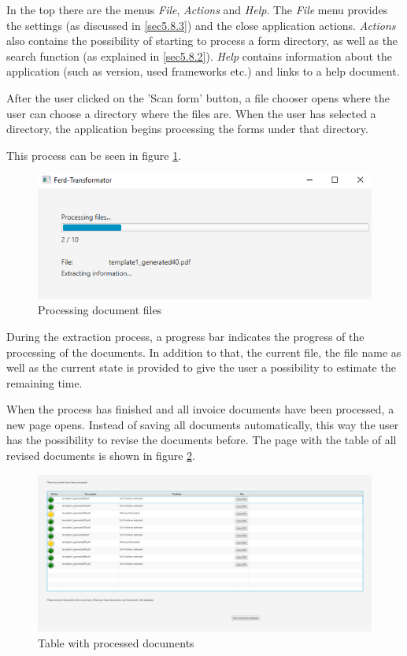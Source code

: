 In the top there are the menus \emph{File}, \emph{Actions} and \emph{Help}. The \emph{File} menu provides the settings (as discussed in \ref{sec5.8.3}) and the close application actions.
\emph{Actions} also contains the possibility of starting to process a form directory, as well as the search function (as explained in \ref{sec5.8.2}).
\emph{Help} contains information about the application (such as version, used frameworks etc.) and links to a help document.

After the user clicked on the 'Scan form' button, a file chooser opens where the user can choose a directory where the files are. When the user has selected a directory, the application begins processing the forms under that directory.

This process can be seen in figure \ref{processingFiles}.

\begin{figure}[ht!]
\centering
\includegraphics[scale=0.6]{Images/GUI/processingFiles.png}
\caption{Processing document files \label{processingFiles}}
\end{figure}

During the extraction process, a progress bar indicates the progress of the processing of the documents. In addition to that, the current file, the file name as well as the current state is provided to give the user a possibility to estimate the remaining time.

When the process has finished and all invoice documents have been processed, a new page opens. Instead of saving all documents automatically, this way the user has the possibility to revise the documents before.
The page with the table of all revised documents is shown in figure \ref{reviseBeforeSafe}.

\begin{figure}[ht!]
\centering
\includegraphics[width=\textwidth]{Images/GUI/reviseBeforeSafe.png}
\caption{Table with processed documents \label{reviseBeforeSafe}}
\end{figure}

